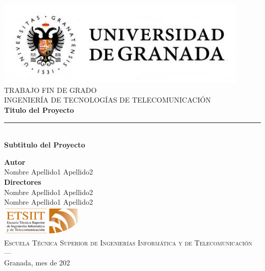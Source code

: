 \begin{titlepage}


\newlength{\centeroffset}
\setlength{\centeroffset}{-0.5\oddsidemargin}
\addtolength{\centeroffset}{0.5\evensidemargin}
\thispagestyle{empty}

\noindent\hspace*{\centeroffset}\begin{minipage}{\textwidth}

\centering
\includegraphics[width=0.9\textwidth]{imagenes/logo_ugr.jpg}\\[1.4cm]

\textsc{ \Large TRABAJO FIN DE GRADO\\[0.2cm]}
\textsc{INGENIERÍA DE TECNOLOGÍAS DE TELECOMUNICACIÓN}\\[1cm]
%
{\Huge\bfseries Titulo del Proyecto\\
}
\noindent\rule[-1ex]{\textwidth}{3pt}\\[3.5ex]
{\large\bfseries Subtitulo del Proyecto}
\end{minipage}

\vspace{2.5cm}
\noindent\hspace*{\centeroffset}\begin{minipage}{\textwidth}
\centering

\textbf{Autor}\\ {Nombre Apellido1 Apellido2}\\[2.5ex]
\textbf{Directores}\\
{Nombre Apellido1 Apellido2\\
Nombre Apellido1 Apellido2}\\[2cm]
\includegraphics[width=0.3\textwidth]{imagenes/etsiit_logo.png}\\[0.1cm]
\textsc{Escuela Técnica Superior de Ingenierías Informática y de Telecomunicación}\\
\textsc{---}\\
Granada, mes de 202
\end{minipage}
\end{titlepage}


